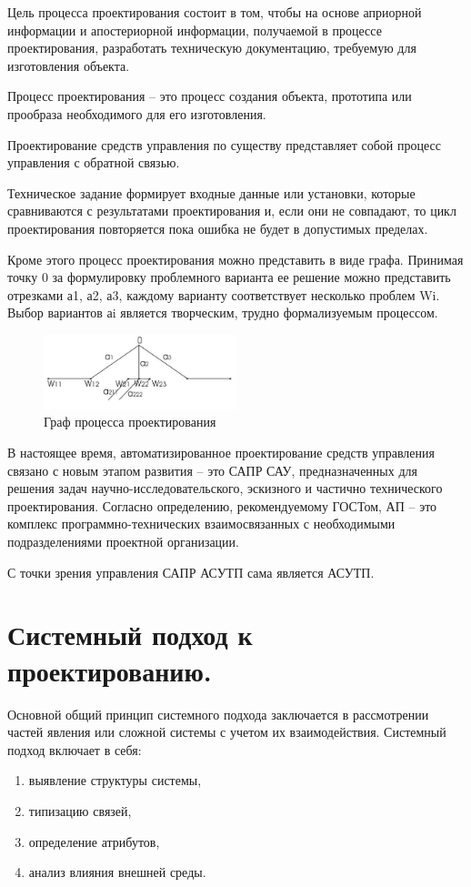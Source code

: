 \documentclass[unicode, 12pt, a4paper, oneside]{article}
\begin{document}
Цель процесса проектирования состоит в том, чтобы на основе априорной информации и апостериорной информации, получаемой в процессе проектирования, разработать техническую документацию, требуемую для изготовления объекта.

Процесс проектирования – это процесс создания объекта, прототипа или прообраза необходимого для его изготовления. 

Проектирование средств управления по существу представляет собой процесс управления с обратной связью.

Техническое задание формирует входные данные или установки, которые сравниваются с результатами проектирования и, если они не совпадают, то цикл проектирования повторяется пока ошибка не будет в допустимых пределах.

Кроме этого процесс проектирования можно представить в виде графа. Принимая точку 0 за формулировку проблемного варианта ее решение можно представить отрезками а1, а2, а3, каждому варианту соответствует несколько проблем Wi.
Выбор вариантов аi является творческим, трудно формализуемым процессом.

\begin{figure}[H]
\centering
\includegraphics[width=0.5\textwidth]{121.jpg}
\caption{Граф процесса проектирования}
\end{figure}

В настоящее время, автоматизированное проектирование средств управления связано с новым этапом развития – это САПР САУ, предназначенных для решения задач научно-исследовательского, эскизного и частично технического проектирования. Согласно определению, рекомендуемому ГОСТом, АП – это комплекс программно-технических взаимосвязанных с необходимыми подразделениями проектной организации.

С точки зрения управления САПР АСУТП сама является АСУТП.

\section{Системный подход к проектированию.}

Основной общий принцип системного подхода заключается в рассмотрении частей явления или сложной системы с учетом их взаимодействия.	Системный подход включает в себя:
\begin{enumerate}
\item выявление структуры системы,
\item типизацию связей,
\item определение атрибутов,
\item анализ влияния внешней среды.
\end{enumerate}
\end{document}
